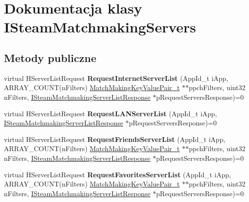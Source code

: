 \hypertarget{class_i_steam_matchmaking_servers}{}\section{Dokumentacja klasy I\+Steam\+Matchmaking\+Servers}
\label{class_i_steam_matchmaking_servers}
\subsection*{Metody publiczne}
\begin{DoxyCompactItemize}
\item 
\mbox{\label{class_i_steam_matchmaking_servers_a5e8c6625f6acec2bed9786e8c7e66c87}} 
virtual H\+Server\+List\+Request {\bfseries Request\+Internet\+Server\+List} (App\+Id\+\_\+t i\+App, A\+R\+R\+A\+Y\+\_\+\+C\+O\+U\+NT(n\+Filters) \hyperlink{struct_match_making_key_value_pair__t}{Match\+Making\+Key\+Value\+Pair\+\_\+t} $\ast$$\ast$ppch\+Filters, uint32 n\+Filters, \hyperlink{class_i_steam_matchmaking_server_list_response}{I\+Steam\+Matchmaking\+Server\+List\+Response} $\ast$p\+Request\+Servers\+Response)=0
\item 
\mbox{\label{class_i_steam_matchmaking_servers_a144360d95efe342d49c4686e8b886c0c}} 
virtual H\+Server\+List\+Request {\bfseries Request\+L\+A\+N\+Server\+List} (App\+Id\+\_\+t i\+App, \hyperlink{class_i_steam_matchmaking_server_list_response}{I\+Steam\+Matchmaking\+Server\+List\+Response} $\ast$p\+Request\+Servers\+Response)=0
\item 
\mbox{\label{class_i_steam_matchmaking_servers_a5293c56e50049e1d915103806f479167}} 
virtual H\+Server\+List\+Request {\bfseries Request\+Friends\+Server\+List} (App\+Id\+\_\+t i\+App, A\+R\+R\+A\+Y\+\_\+\+C\+O\+U\+NT(n\+Filters) \hyperlink{struct_match_making_key_value_pair__t}{Match\+Making\+Key\+Value\+Pair\+\_\+t} $\ast$$\ast$ppch\+Filters, uint32 n\+Filters, \hyperlink{class_i_steam_matchmaking_server_list_response}{I\+Steam\+Matchmaking\+Server\+List\+Response} $\ast$p\+Request\+Servers\+Response)=0
\item 
\mbox{\label{class_i_steam_matchmaking_servers_a4dafd8c87dc378a8510a348de54efd65}} 
virtual H\+Server\+List\+Request {\bfseries Request\+Favorites\+Server\+List} (App\+Id\+\_\+t i\+App, A\+R\+R\+A\+Y\+\_\+\+C\+O\+U\+NT(n\+Filters) \hyperlink{struct_match_making_key_value_pair__t}{Match\+Making\+Key\+Value\+Pair\+\_\+t} $\ast$$\ast$ppch\+Filters, uint32 n\+Filters, \hyperlink{class_i_steam_matchmaking_server_list_response}{I\+Steam\+Matchmaking\+Server\+List\+Response} $\ast$p\+Request\+Servers\+Response)=0
$$
\end{DoxyCompactItemize}
